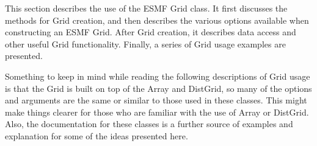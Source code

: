 

This section describes the use of the ESMF Grid class. It first discusses
the methods for Grid creation, and then describes the various options 
available when constructing an ESMF Grid. After Grid creation, it describes
data access and other useful Grid functionality. Finally, a series of Grid
usage examples are presented. 

  Something to keep in mind while reading the following descriptions of Grid usage is that 
the Grid is built on top of the Array and DistGrid, so many of the 
options and arguments are the same or similar to those used in these classes.
This might make things clearer for those who are familiar
with the use of Array or DistGrid.  Also, the documentation for these classes 
is a further source of examples and explanation for some of the ideas presented here. 



 








